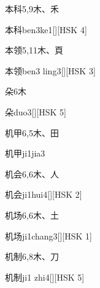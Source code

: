 \begin{entry}{本科}{5,9}{⽊、⽲}
  \begin{phonetics}{本科}{ben3ke1}[][HSK 4]
  \end{phonetics}
\end{entry}

\begin{entry}{本领}{5,11}{⽊、⾴}
  \begin{phonetics}{本领}{ben3 ling3}[][HSK 3]
  \end{phonetics}
\end{entry}

\begin{entry}{朵}{6}{⽊}
  \begin{phonetics}{朵}{duo3}[][HSK 5]
  \end{phonetics}
\end{entry}

\begin{entry}{机甲}{6,5}{⽊、⽥}
  \begin{phonetics}{机甲}{ji1jia3}
  \end{phonetics}
\end{entry}

\begin{entry}{机会}{6,6}{⽊、⼈}
  \begin{phonetics}{机会}{ji1hui4}[][HSK 2]
  \end{phonetics}
\end{entry}

\begin{entry}{机场}{6,6}{⽊、⼟}
  \begin{phonetics}{机场}{ji1chang3}[][HSK 1]
  \end{phonetics}
\end{entry}

\begin{entry}{机制}{6,8}{⽊、⼑}
  \begin{phonetics}{机制}{ji1 zhi4}[][HSK 5]
  \end{phonetics}
\end{entry}

